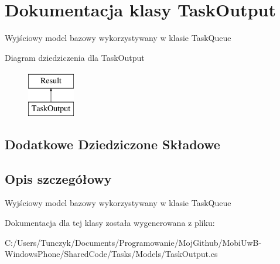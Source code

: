 \hypertarget{a00067}{}\section{Dokumentacja klasy Task\+Output}
\label{a00067}


Wyjściowy model bazowy wykorzystywany w klasie Task\+Queue  


Diagram dziedziczenia dla Task\+Output\begin{figure}[H]
\begin{center}
\leavevmode
\includegraphics[height=2.000000cm]{dc/ddf/a00067}
\end{center}
\end{figure}
\subsection*{Dodatkowe Dziedziczone Składowe}


\subsection{Opis szczegółowy}
Wyjściowy model bazowy wykorzystywany w klasie Task\+Queue 



Dokumentacja dla tej klasy została wygenerowana z pliku\+:\begin{DoxyCompactItemize}
\item 
C\+:/\+Users/\+Tunczyk/\+Documents/\+Programowanie/\+Moj\+Github/\+Mobi\+Uw\+B-\/\+Windows\+Phone/\+Shared\+Code/\+Tasks/\+Models/Task\+Output.\+cs\end{DoxyCompactItemize}
